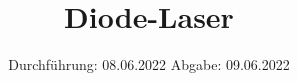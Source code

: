

\subject{V60}
\title{Diode-Laser}
\date{%
  Durchführung: 08.06.2022
  \hspace{3em}
  Abgabe: 09.06.2022
}



\maketitle
\thispagestyle{empty}
\tableofcontents
\newpage





\nocite{*}
\printbibliography{}


